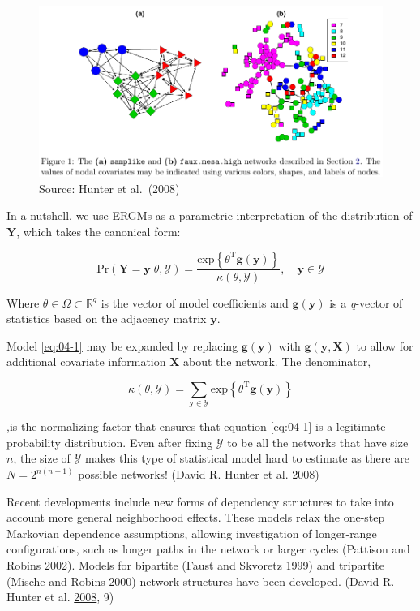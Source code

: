 \documentclass[]{book}
\begin{document}
\begin{figure}
\centering
\includegraphics{hunter2008.png}
\caption{Source: Hunter et al.~(2008)}
\end{figure}

In a nutshell, we use ERGMs as a parametric interpretation of the distribution of \(\mathbf{Y}\),
which takes the canonical form:

\[
\mbox{Pr}\left(\mathbf{Y}=\mathbf{y}|\theta, \mathcal{Y}\right) = \frac{\mbox{exp}\left\{\theta^{\mbox{T}}\mathbf{g}(\mathbf{y})\right\}}{\kappa\left(\theta, \mathcal{Y}\right)},\quad\mathbf{y}\in\mathcal{Y}
\label{eq:04-1}
\]

Where \(\theta\in\Omega\subset\mathbb{R}^q\) is the vector of model coefficients and \(\mathbf{g}(\mathbf{y})\) is a \emph{q}-vector of statistics based on the adjacency matrix \(\mathbf{y}\).

Model \eqref{eq:04-1} may be expanded by replacing \(\mathbf{g}(\mathbf{y})\) with \(\mathbf{g}(\mathbf{y}, \mathbf{X})\) to allow for additional covariate information \(\mathbf{X}\) about the network. The denominator,

\[
\kappa\left(\theta,\mathcal{Y}\right) = \sum_{\mathbf{y}\in\mathcal{Y}}\mbox{exp}\left\{\theta^{\mbox{T}}\mathbf{g}(\mathbf{y})\right\}
\]

,is the normalizing factor that ensures that equation \eqref{eq:04-1} is a legitimate probability distribution. Even after fixing \(\mathcal{Y}\) to be all the networks that have size \(n\), the size of \(\mathcal{Y}\) makes this type of statistical model hard to estimate as there are \(N = 2^{n(n-1)}\) possible networks! (David R. Hunter et al. \protect\hyperlink{ref-Hunter2008}{2008})

Recent developments include new forms of dependency structures to take into account more general neighborhood effects. These models relax the one-step Markovian dependence assumptions, allowing investigation of longer-range configurations, such as longer paths in the network or larger cycles (Pattison and Robins 2002). Models for bipartite (Faust and Skvoretz 1999) and tripartite (Mische and Robins 2000) network structures have been developed. (David R. Hunter et al. \protect\hyperlink{ref-Hunter2008}{2008}, 9)
\end{document}

